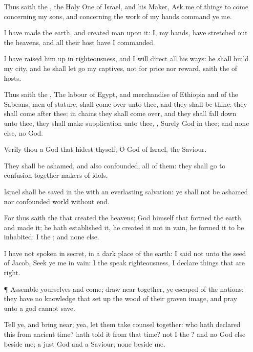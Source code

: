{\par }{\PP {}Thus
saith the
{}, the Holy
One of
Israel, and his
Maker,
Ask me of things to
come concerning my
sons, and concerning the
work of my
hands
command ye me.

I have
made the
earth, and
created
man upon it: I,
{} my
hands, have stretched
out the
heavens, and all their
host have I
commanded.

I have raised him
up in
righteousness, and I will
direct all his
ways: he shall
build my
city, and he shall let
go my
captives, not for
price nor
reward,
saith the
{} of
hosts.

Thus
saith the
{}, The
labour of
Egypt, and
merchandise of
Ethiopia and of the
Sabeans,
men of
stature, shall come
over unto thee, and they shall be thine: they shall
come
after thee; in
chains they shall come
over, and they shall fall
down unto thee, they shall make
supplication unto thee,
{}, Surely
God
{} in thee; and
{} none else,
{}
no
God.

Verily thou
{} a
God that
hidest thyself, O
God of
Israel, the
Saviour.

They shall be
ashamed, and also
confounded, all of them: they shall
go to
confusion
together
{}
makers of
idols.

Israel shall be
saved in the
{} with an
everlasting
salvation: ye shall not be
ashamed nor
confounded
world without
end.

For thus
saith the
{} that
created the
heavens;
God himself that
formed the
earth and
made it; he hath
established it, he
created it not in
vain, he
formed it to be
inhabited: I
{} the
{}; and
{} none else.

I have not
spoken in
secret, in a
dark
place of the
earth: I
said not unto the
seed of
Jacob,
Seek ye me in
vain: I the
{}
speak
righteousness, I
declare things that are
right.


\par }{\PP {}¶
Assemble yourselves and
come; draw
near
together, ye
{}
escaped of the
nations: they have no
knowledge that set
up the
wood of their graven
image, and
pray unto a
god
{} cannot
save.

Tell ye, and bring
{}
near; yea, let them take
counsel
together: who hath
declared this from ancient
time?
{} hath
told it from that time?
{} not I the
{}? and
{} no
God else
beside me; a
just
God and a
Saviour;
{}
none
beside me.

}
